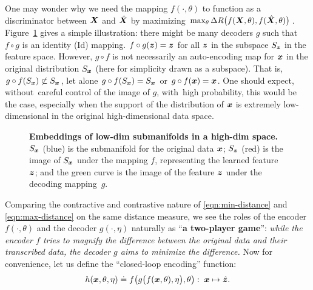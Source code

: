 \documentclass[../../book-main.tex]{subfiles}
\begin{document}
\begin{example}
One may wonder why we need the mapping $f(\cdot, \theta)$ to function as a discriminator between $\bm{X}$ and $\hat {\bm{X}}$ by maximizing $\max_\theta \Delta R\big(f(\bm{X},\theta), f(\hat {\bm{X}},\theta)\big)$. Figure~\ref{fig:decoder} gives a simple illustration: there might be many decoders $g$ such that $f\circ g$ is an identity (Id) mapping. $f\circ g(\bm{z}) = \bm{z} $ for all $\bm{z}$ in the subspace $S_{\bm{z}}$ in the feature space. However, $g\circ f$ is not necessarily an auto-encoding map for $\bm{x}$ in the original distribution $S_{\bm{x}}$ (here for simplicity drawn as a subspace). That is, $g\circ f(S_{\bm{x}}) \not\subset S_{\bm{x}}$, let alone $g\circ f(S_{\bm{x}}) = S_{\bm{x}}$ or $g\circ f(\bm{x}) = \bm{x}$. One should expect, without~careful control of the image of $g$, with~high probability, this would be the case, especially when the support of the distribution of $\bm{x}$ is extremely  low-dimensional in the original high-dimensional data space. 
\end{example}
\begin{figure}
\caption{\textbf{{Embeddings} %
 of low-dim submanifolds in a high-dim space.} $S_{\bm{x}}$ (blue) is the submanifold for the original data $\bm{x}$; $S_{\bm{z}}$ (red) is the image of $S_{\bm{x}}$ under the mapping $f$, representing the learned feature $\bm{z}$; and the green curve  is the image of the feature $\bm{z}$ under the decoding \mbox{mapping $g$.} } \label{fig:decoder}
\end{figure} 

Comparing the contractive and contrastive nature of \eqref{eqn:min-distance} and \eqref{eqn:max-distance} on the same distance measure, we see the roles of the encoder $f(\cdot, \theta)$ and the decoder $g(\cdot, \eta)$ naturally as ``{\bf a  two-player game}'': {\em while the encoder $f$ tries to magnify the difference between the original data and their transcribed data, the decoder $g$ aims to minimize the difference.} Now for convenience, let us define the ``closed-loop encoding'' function:
\begin{equation}
    h(\bm{x}, \theta, \eta) \doteq f\big(g\big(f(\bm{x}, \theta), \eta\big), \theta\big): \; \bm{x} \mapsto \hat {\bm{z}}.
\end{equation}
\end{document}
